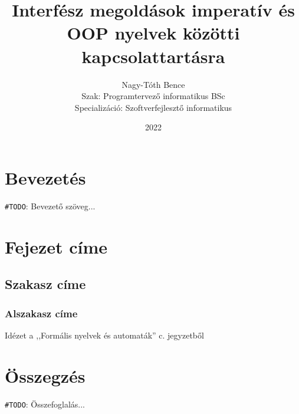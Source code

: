 \documentclass[tocnopagenum]{thesis-ekf}
\newtheorem{tetel}{Tétel}[chapter]
\theoremstyle{definition}
\newtheorem{definicio}[tetel]{Definíció}
\theoremstyle{remark}
\newtheorem{megjegyzes}[tetel]{Megjegyzés}
\begin{document}
	\title{Interfész megoldások imperatív és OOP nyelvek közötti kapcsolattartásra}
	\author{Nagy-Tóth Bence\\Szak: Programtervező informatikus BSc\\Specializáció: Szoftverfejlesztő informatikus}
	\date{2022}
	\maketitle
	\tableofcontents
	
	\chapter*{Bevezetés}
	\verb*|#TODO|: Bevezető szöveg...
	
	\chapter{Fejezet címe}
	\section{Szakasz címe}
	\subsection{Alszakasz címe}
	Idézet a ,,Formális nyelvek és automaták'' c. jegyzetből
	\cite{formnyelvek}
	\begin{comment}
		Ezek később lesznek hasznosak
		\begin{tetel}
			Tétel szövege.
		\end{tetel}
		
		\begin{proof}
			Bizonyítás szövege.
		\end{proof}
		
		\begin{definicio}
			Definíció szövege.
		\end{definicio}
		
		\begin{megjegyzes}
			Megjegyzés szövege.
		\end{megjegyzes}
	\end{comment}
	
	\chapter*{Összegzés}
	\verb*|#TODO|: Összefoglalás...
	
	
	
\end{document}

